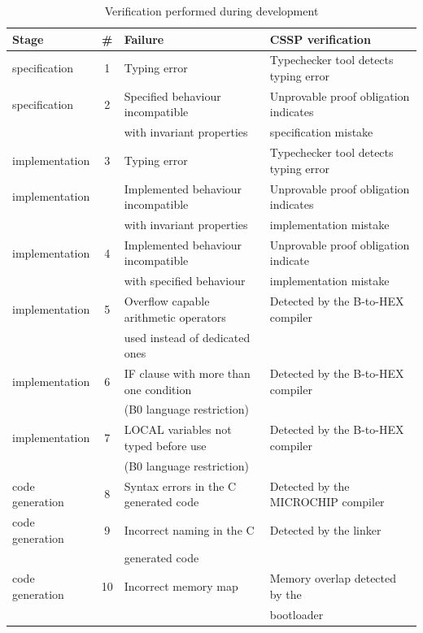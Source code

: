 \begin{table}[ht]
\small
\begin{tabular}{|l|c|l|l|}
\hline
\textbf{Stage} & \textbf{\#} &  \textbf{Failure}                  & \textbf{CSSP verification} \\ \hline
specification  & 1 & Typing error                      & Typechecker tool detects typing error \\ \hline
specification  & 2 & Specified behaviour incompatible  & Unprovable proof obligation indicates   \\
               & & with invariant properties         & specification mistake       \\ \hline           
implementation & 3 & Typing error                      & Typechecker tool detects typing error \\ \hline
implementation &   & Implemented behaviour incompatible  & Unprovable proof obligation indicates   \\
               &   & with invariant properties         & implementation mistake       \\ \hline           
implementation & 4 & Implemented behaviour incompatible  & Unprovable proof obligation indicate   \\
               &   & with specified behaviour          & implementation mistake       \\ \hline 
implementation & 5 & Overflow capable arithmetic operators  & Detected by the B-to-HEX compiler   \\
               &   & used instead of dedicated ones     &       \\ \hline 
implementation & 6 & IF clause with more than one condition  & Detected by the B-to-HEX compiler   \\
               &   & (B0 language restriction)          &       \\ \hline 
implementation & 7 & LOCAL variables not typed before use  & Detected by the B-to-HEX compiler   \\
               &   & (B0 language restriction)          &       \\ \hline                
code generation & 8 & Syntax errors in the C generated code  & Detected by the MICROCHIP compiler   \\  \hline
code generation & 9 & Incorrect naming in the C         & Detected by the linker   \\            
                &   & generated code                    &           \\ \hline  
code generation & 10 & Incorrect memory map             & Memory overlap detected by the   \\  
                &    &                                 &  bootloader   \\ \hline 
\end{tabular}
\caption{Verification performed during development}
\label{safety:verif-dev}
\end{table}     
